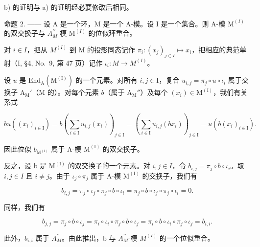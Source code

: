 b) 的证明与 a) 的证明经必要修改后相同。

命题 2. —— 设 A 是一个环，M 是一个 A-模。设 I 是一个集合。则 A-模 \(\mathrm{M}^{(I)}\) 的双交换子与 \(A_{M}^{\prime\prime}\)-模 \(\mathrm{M}^{(I)}\) 的位似环重合。

对 \(i \in I\)，把从 \(M^{(I)}\) 到 M 的投影同态记作 \(\pi_{i} : (x_{j})_{j \in I} \mapsto x_{i}\)，把相应的典范单射（I, §4, No.~9, 第 47 页）记作 \(\iota_{i} : M \to M^{(I)}\)。

设 \(u\) 是 \(\mathrm{End}_{\mathrm{A}}(\mathrm{M}^{(\mathrm{I})})\) 的一个元素。对所有 \(i,j \in \mathrm{I}\)，复合 \(u_{i,j} = \pi_j \circ u \circ \iota_i\) 属于交换子 \(\mathrm{A}_{\mathrm{M}}'\)（\(\mathrm{M}\) 的）。对每个元素 \(b\)（属于 \(\mathrm{A}_{\mathrm{M}}''\)）及每个 \((x_i) \in \mathrm{M}^{(\mathrm{I})}\)，我们有关系式

\[
b u \left(\left(x _ {i}\right) _ {i \in \mathrm{I}}\right) = b \left(\sum_ {i \in \mathrm{I}} u _ {i, j} \left(x _ {i}\right)\right) _ {j \in \mathrm{I}} = \left(\sum_ {i \in \mathrm{I}} u _ {i, j} \left(b x _ {i}\right)\right) _ {j \in \mathrm{I}} = u \left(b \left(x _ {i}\right) _ {i \in \mathrm{I}}\right).
\]

因此位似 \(b_{\mathrm{M}^{(\mathrm{I})}}\) 属于 A-模 \(\mathrm{M}^{(\mathrm{I})}\) 的双交换子。

反之，设 b 是 \(\mathrm{M}^{(\mathrm{I})}\) 的双交换子的一个元素。对 \(i,j\in I\)，令 \(b_{i,j}=\pi_{j}\circ b\circ\iota_{i}\)。取 \(i,j\in I\) 且 \(i\neq j\)。由于 \(\iota_{j}\circ\pi_{j}\) 属于 A-模 \(\mathrm{M}^{(\mathrm{I})}\) 的交换子，我们有

\[
b _ {i, j} = \pi_ {j} \circ \iota_ {j} \circ \pi_ {j} \circ b \circ \iota_ {i} = \pi_ {j} \circ b \circ \iota_ {j} \circ \pi_ {j} \circ \iota_ {i} = 0.
\]

同样，我们有

\[
b _ {j, j} = \pi_ {j} \circ b \circ \iota_ {j} = \pi_ {i} \circ \iota_ {i} \circ \pi_ {j} \circ b \circ \iota_ {j} = \pi_ {i} \circ b \circ \iota_ {i} \circ \pi_ {j} \circ \iota_ {j} = b _ {i, i}.
\]

此外，\(b_{i,i}\) 属于 \(A_{M}^{\prime\prime}\)。由此推出，b 与 \(A_{M}^{\prime\prime}\)-模 \(M^{(I)}\) 的一个位似重合。

